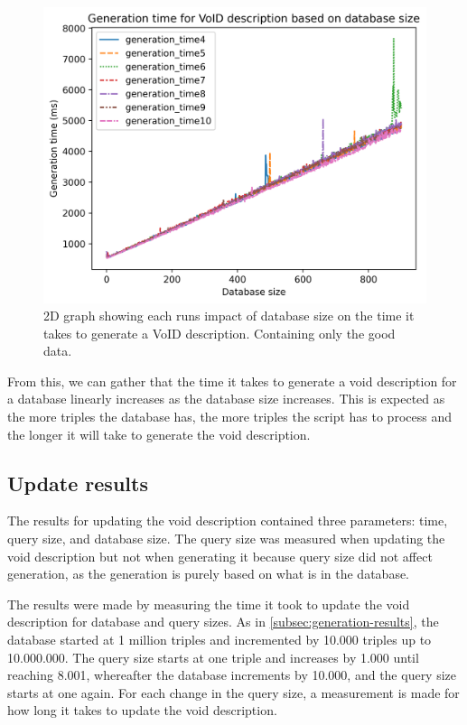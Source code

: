 \begin{figure}[htb!]
    \centering
    \includegraphics[width=0.8\columnwidth]{figures/generation-results-graph-all-good.png}
    \caption{2D graph showing each runs impact of database size on the time it takes to generate a VoID description. Containing only the good data.}
    \label{fig:generate-dbsize-10-runs-good}
\end{figure}

From this, we can gather that the time it takes to generate a \gls{void} description for a database linearly increases as the database size increases. This is expected as the more triples the database has, the more triples the script has to process and the longer it will take to generate the \gls{void} description.


\subsection{Update results}\label{subsec:update-results}
The results for updating the \gls{void} description contained three parameters: time, query size, and database size. The query size was measured when updating the \gls{void} description but not when generating it because query size did not affect generation, as the generation is purely based on what is in the database.

The results were made by measuring the time it took to update the \gls{void} description for database and query sizes. As in \autoref{subsec:generation-results}, the database started at 1 million triples and incremented by 10.000 triples up to 10.000.000. The query size starts at one triple and increases by 1.000 until reaching 8.001, whereafter the database increments by 10.000, and the query size starts at one again. For each change in the query size, a measurement is made for how long it takes to update the \gls{void} description.

